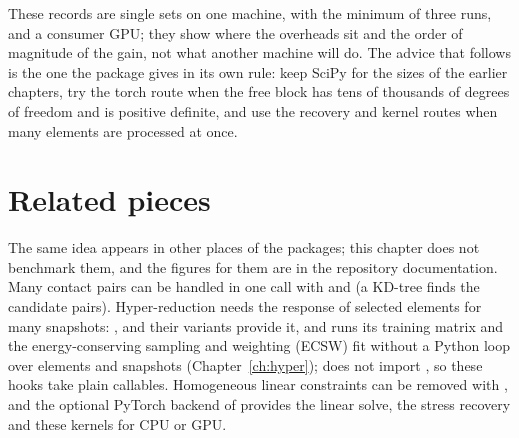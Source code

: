 These records are single sets on one machine, with the minimum of three runs, and a consumer GPU; they show where the overheads sit and the order of magnitude of the gain, not what another machine will do. The advice that follows is the one the package gives in its own rule: keep SciPy for the sizes of the earlier chapters, try the torch route when the free block has tens of thousands of degrees of freedom and is positive definite, and use the recovery and kernel routes when many elements are processed at once.

\section{Related pieces}\label{sec:bk-related}

The same idea appears in other places of the packages; this chapter does not benchmark them, and the figures for them are in the repository documentation. Many contact pairs can be handled in one call with  and  (a KD-tree finds the candidate pairs). Hyper-reduction needs the response of selected elements for many snapshots: ,  and their  variants provide it, and \rom{} runs its training matrix and the energy-conserving sampling and weighting (ECSW) fit without a Python loop over elements and snapshots (Chapter~\ref{ch:hyper}); \rom{} does not import \fea{}, so these hooks take plain callables. Homogeneous linear constraints can be removed with , and the optional PyTorch backend of  provides the linear solve, the stress recovery and these kernels for CPU or GPU.


